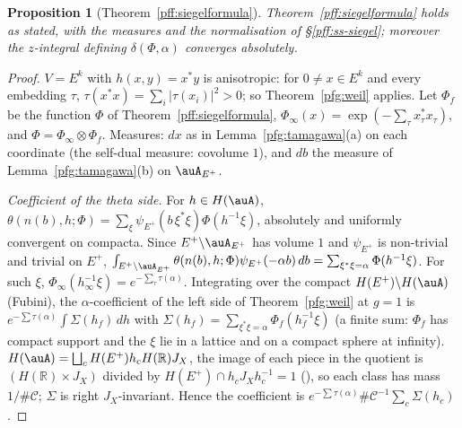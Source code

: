 \documentclass[10pt]{amsart}
\newtheorem{proposition}[theorem]{Proposition}
\theoremstyle{definition}
\theoremstyle{remark}
\newcommand{\R}{\mathbb R}
\begin{document}
\begin{proposition}[Theorem~\ref{pff:siegelformula}]\label{pfg:siegel}
Theorem~\ref{pff:siegelformula} holds as stated, with the measures and the normalisation of \S\ref{pff:ss-siegel}; moreover
the $z$-integral defining $\delta(\Phi,\alpha)$ converges absolutely.
\end{proposition}
\begin{proof}
$V=E^k$ with $h(x,y)=x^*y$ is anisotropic: for $0\ne x\in E^k$ and every embedding $\tau$,
$\tau(x^*x)=\sum_i|\tau(x_i)|^2>0$; so Theorem~\ref{pfg:weil} applies.
Let $\Phi_f$ be the function $\Phi$ of Theorem~\ref{pff:siegelformula}, $\Phi_\infty(x)=\exp(-\sum_\tau x_\tau^*x_\tau)$, and
$\Phi=\Phi_\infty\otimes\Phi_f$. Measures: $dx$ as in Lemma~\ref{pfg:tamagawa}(a) on each coordinate (the self-dual
measure: covolume $1$), and $db$ the measure of Lemma~\ref{pfg:tamagawa}(b) on $\auA_{E^+}$.

\emph{Coefficient of the theta side.} For $h\in H(\auA)$, $\theta(n(b),h;\Phi)=\sum_\xi\psi_{E^+}(b\,\xi^*\xi)\Phi(h^{-1}\xi)$,
absolutely and uniformly convergent on compacta. Since $E^+\backslash\auA_{E^+}$ has volume $1$ and $\psi_{E^+}$ is
non-trivial and trivial on $E^+$, $\int_{E^+\backslash\auA_{E^+}}\theta(n(b),h;\Phi)\psi_{E^+}(-\alpha b)\,db=\sum_{\xi^*\xi=\alpha}
\Phi(h^{-1}\xi)$. For such $\xi$, $\Phi_\infty(h_\infty^{-1}\xi)=e^{-\sum_\tau\tau(\alpha)}$. Integrating over the compact
$H(E^+)\backslash H(\auA)$ (Fubini), the $\alpha$-coefficient of the left side of Theorem~\ref{pfg:weil} at $g=1$ is
$e^{-\sum\tau(\alpha)}\int\Sigma(h_f)\,dh$ with $\Sigma(h_f)=\sum_{\xi^*\xi=\alpha}\Phi_f(h_f^{-1}\xi)$ (a finite sum: $\Phi_f$ has compact
support and the $\xi$ lie in a lattice and on a compact sphere at infinity). $H(\auA)=\bigsqcup_cH(E^+)h_cH(\R)J_X$, the image of
each piece in the quotient is $(H(\R)\times J_X)$ divided by $H(E^+)\cap h_cJ_Xh_c^{-1}=1$ ({\cite[Lemma~14.5]{P46}}), so each class
has mass $1/\#\mathcal C$; $\Sigma$ is right $J_X$-invariant. Hence the coefficient is
$e^{-\sum\tau(\alpha)}\#\mathcal C^{-1}\sum_c\Sigma(h_c)$.


\end{proof}
\end{document}
